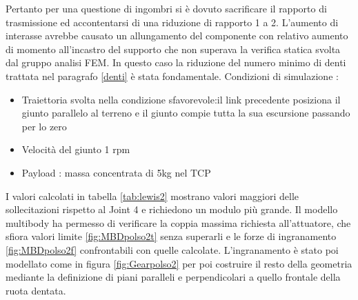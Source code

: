 \documentclass[%
corpo=11pt,
twoside,
 stile=classica,
oldstyle,
greek,%
]{toptesi}
\begin{document}
		Pertanto per una questione di ingombri si è dovuto sacrificare il rapporto di trasmissione ed accontentarsi di una riduzione di rapporto 1 a 2. L'aumento di interasse avrebbe causato un allungamento del componente con relativo aumento di momento all'incastro del supporto che non superava la verifica statica svolta dal gruppo analisi FEM. 
		In questo caso la riduzione del numero minimo di denti trattata nel paragrafo \ref{denti} è stata fondamentale. 
		Condizioni di simulazione :
		\begin{itemize} 
			\item Traiettoria svolta nella condizione sfavorevole:il link precedente posiziona il giunto parallelo al terreno e il giunto compie tutta la sua escursione passando per lo zero
			\item Velocità del giunto 1 rpm
			\item Payload : massa concentrata di 5kg nel TCP 
		\end{itemize}
			I valori calcolati in tabella \ref{tab:lewis2} mostrano valori maggiori delle sollecitazioni rispetto al Joint 4 e richiedono un modulo più grande. 
		Il modello multibody ha permesso di verificare la coppia massima richiesta all'attuatore, che sfiora valori limite \ref{fig:MBDpolso2t} senza superarli e le forze di ingranamento \ref{fig:MBDpolso2f} confrontabili con quelle calcolate.
		L'ingranamento è stato poi modellato come in figura \ref{fig:Gearpolso2} per poi costruire il resto della geometria mediante la definizione di piani paralleli e perpendicolari a quello frontale della ruota dentata. 
		
\end{document}
